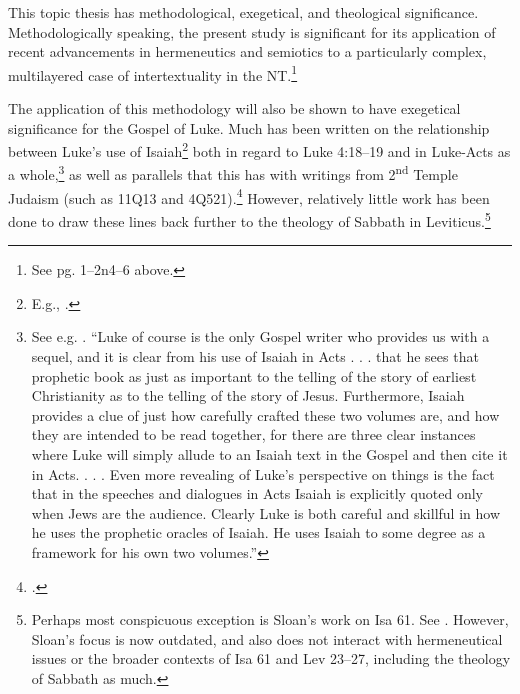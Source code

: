 \documentclass[A4,12pt]{article}
\begin{document}
This topic thesis has methodological, exegetical, and theological significance. Methodologically speaking, the present study is significant for its application of recent advancements in hermeneutics and semiotics to a particularly complex, multilayered case of intertextuality in the NT.\footnote
  {
    See pg. 1--2n4--6 above.
  }

The application of this methodology will also be shown to have exegetical significance for the Gospel of Luke. Much has been written on the relationship between Luke's use of Isaiah\footnote
  {
    E.g., \cites{beersFollowersJesusServant2015}{paoLuke2007}{sandersIsaiah61Luke1993}{koetIsaiahLukeActs2005}{smitFunctionTwoQuotations2013}{mullerReceptionOldTestament2001}.
  }
both in regard to Luke 4:18--19 and in Luke-Acts as a whole,\footnote
  {
    See e.g. \cite[306-315]{witheringtonIsaiahOldNew2017}. ``Luke of course is the only Gospel writer who provides us with a sequel, and it is clear from his use of Isaiah in Acts . . . that he sees that prophetic book as just as important to the telling of the story of earliest Christianity as to the telling of the story of Jesus.  Furthermore, Isaiah provides a clue of just how carefully crafted these two volumes are, and how they are intended to be read together, for there are three clear instances where Luke will simply allude to an Isaiah text in the Gospel and then cite it in Acts. . . . Even more revealing of Luke's perspective on things is the fact that in the speeches and dialogues in Acts Isaiah is explicitly quoted only when Jews are the audience. Clearly Luke is both careful and skillful in how he uses the prophetic oracles of Isaiah. He uses Isaiah to some degree as a framework for his own two volumes.''
  } 
as well as parallels that this has with writings from 2\textsuperscript{nd} Temple Judaism (such as 11Q13 and 4Q521).\footnote
  {
    \cites[310]{witheringtonIsaiahOldNew2017}[213]{greenGospelLuke1997}.
  }
However, relatively little work has been done to draw these lines back further to the theology of Sabbath in Leviticus.\footnote
  {
    Perhaps most conspicuous exception is Sloan's work on Isa 61. See \cite{sloanjr.FavorableYearLord1977}. However, Sloan's focus is now outdated, and also does not interact with hermeneutical issues or the broader contexts of Isa 61 and Lev 23--27, including the theology of Sabbath as much.
  }
\end{document}
